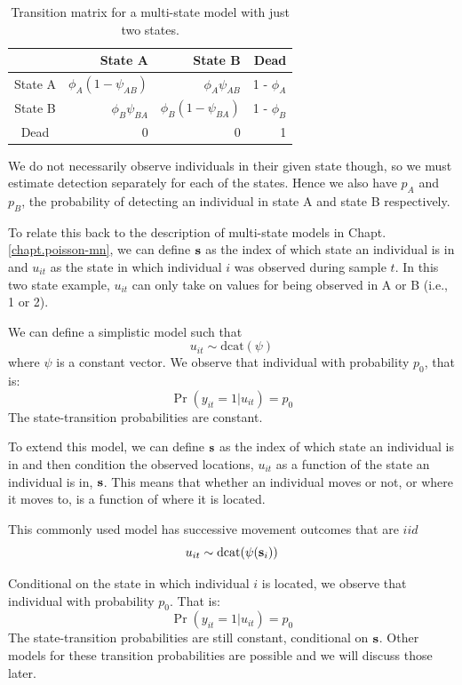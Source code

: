 \begin{table}[htb!]
\centering
\caption{
Transition matrix for a multi-state model with just two states.
}
\begin{tabular}{crrr}
\hline \hline
    &   State A &   State B   &   Dead \\  \hline
State A & $\phi_A(1-\psi_{AB})$ & $\phi_A \psi_{AB}$ & 1 - $\phi_A$ \\
State B & $\phi_B \psi_{BA}$ & $\phi_B(1-\psi_{BA})$ & 1 - $\phi_B$ \\
Dead & 0 & 0 & 1\\ \hline
\end{tabular}
\label{open.tab.CJSmulti-matrix}
\end{table}

We do not necessarily observe individuals in their given state though, so we must estimate detection
separately for each of the states.  Hence we also have $p_A$ and $p_B$, the probability of detecting
an individual in state A and state B respectively.

To relate this back to the description of multi-state models in Chapt. \ref{chapt.poisson-mn}, we can define ${\bf s}$
as the index of which state an individual is in and $u_{it}$ as
the state in which individual $i$ was observed during sample $t$.  In this two state example,
$u_{it}$ can only take on values for being observed in A or B (i.e., 1 or 2).

We can define a simplistic model such that
\[
u_{it} \sim  \mathrm{dcat}(\psi)
\]
where $\psi$ is a constant vector.
We observe that individual with probability $p_{0}$, that is:
\[
 \Pr(y_{it} = 1| u_{it} )  = p_{0}
\]
The state-transition probabilities are constant.


To extend this model, we can define ${\bf s}$
as the index of which state
an individual is in and then condition the observed locations, $u_{it}$
as a function of the state an individual is in, ${\bf s}$. This
means that whether an individual moves or not, or where it moves to, is a function of where it is located.

This commonly used model has successive movement outcomes that
are $iid$
\[
u_{it} \sim  \text{dcat}( {\psi}({\bf s}_{i}) )
\]

Conditional on the state in which individual $i$ is located, we
observe that individual with probability $p_{0}$. That is:
\[
 \Pr(y_{it} = 1| u_{it} )  = p_{0}
\]
The state-transition
probabilities are still constant, conditional on ${\bf s}$.
Other models for these transition probabilities
are possible and we will discuss those later.

